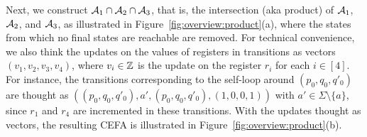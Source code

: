 Next, 
we construct $\mathcal{A}_1 \cap \mathcal{A}_2 \cap \mathcal{A}_3$, that is, the intersection (aka product) of $\mathcal{A}_1$, $\mathcal{A}_2$, and $\mathcal{A}_3$, as illustrated in Figure~\ref{fig:overview:product}(a), where the states from which no final states are reachable are removed. 
For technical convenience, we also think the updates on the values of registers in transitions as vectors $(v_1, v_2, v_3, v_4)$, where $v_i \in \mathbb{Z}$ is the update on the register $r_{i}$ for each $i \in [4]$. For instance, the transitions corresponding to the self-loop around $(p_0, q_0, q'_0)$ are thought as $((p_0, q_0, q'_0), a', (p_0, q_0, q'_0), (1,0,0,1))$ with $a' \in \Sigma \setminus \{a\}$, since $r_1$ and $r_4$ are incremented in these transitions. With the updates thought as vectors, the resulting CEFA is illustrated in Figure~\ref{fig:overview:product}(b).

